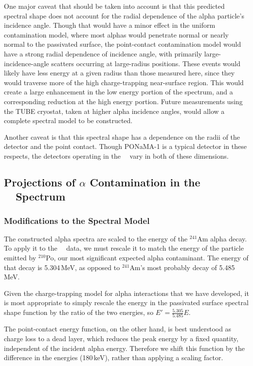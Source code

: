 One major caveat that should be taken into account is that this predicted spectral shape does not account for the radial dependence of the alpha particle's incidence angle. Though that would have a minor effect in the uniform contamination model, where most alphas would penetrate normal or nearly normal to the passivated surface, the point-contact contamination model would have a strong radial dependence of incidence angle, with primarily large-incidence-angle scatters occurring at large-radius positions. These events would likely have less energy at a given radius than those measured here, since they would traverse more of the high charge-trapping near-surface region. This would create a large enhancement in the low energy portion of the spectrum, and a corresponding reduction at the high energy portion. Future measurements using the TUBE cryostat, taken at higher alpha incidence angles, would allow a complete spectral model to be constructed.

Another caveat is that this spectral shape has a dependence on the radii of the detector and the point contact. Though PONaMA-1 is a typical detector in these respects, the detectors operating in the \MJ\ \DEM\ vary in both of these dimensions. 

\subsection{Projections of $\alpha$ Contamination in the \MJ\ \DEM\ Spectrum}
\subsubsection{Modifications to the Spectral Model}
The constructed alpha spectra are scaled to the energy of the $^{241}$Am alpha decay. To apply it to the \MJ\ \DEM\ data, we must rescale it to match the energy of the particle emitted by $^210$Po, our most significant expected alpha contaminant. The energy of that decay is 5.304\,MeV, as opposed to $^{241}$Am's most probably decay of 5.485\,MeV. 

Given the charge-trapping model for alpha interactions that we have developed, it is most appropriate to simply rescale the energy in the passivated surface spectral shape function by the ratio of the two energies, so $E' = \frac{5.305}{5.485}E$.

The point-contact energy function, on the other hand, is best understood as charge loss to a dead layer, which reduces the peak energy by a fixed quantity, independent of the incident alpha energy. Therefore we shift this function by the difference in the energies (180\,keV), rather than applying a scaling factor. 

